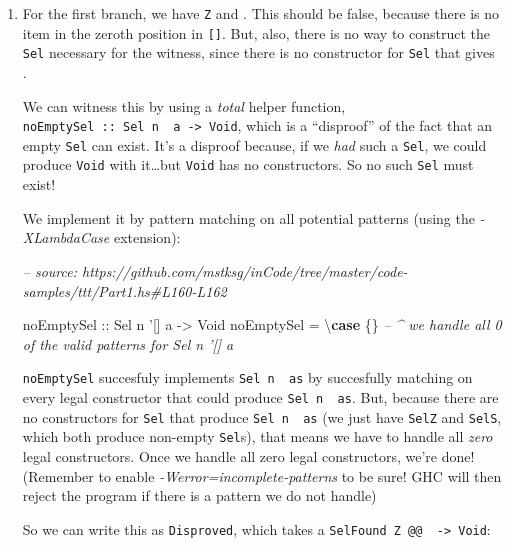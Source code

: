 \documentclass[]{article}
\newenvironment{Shaded}{}{}
\newcommand{\CommentTok}[1]{\textcolor[rgb]{0.38,0.63,0.69}{\textit{#1}}}
\newcommand{\DataTypeTok}[1]{\textcolor[rgb]{0.56,0.13,0.00}{#1}}
\newcommand{\FunctionTok}[1]{\textcolor[rgb]{0.02,0.16,0.49}{#1}}
\newcommand{\KeywordTok}[1]{\textcolor[rgb]{0.00,0.44,0.13}{\textbf{#1}}}
\newcommand{\NormalTok}[1]{#1}
\newcommand{\OtherTok}[1]{\textcolor[rgb]{0.00,0.44,0.13}{#1}}
\begin{document}
\begin{enumerate}
\def\labelenumi{\arabic{enumi}.}
\item
  For the first branch, we have \texttt{\textquotesingle{}Z} and
  \texttt{\textquotesingle{}{[}{]}}. This should be false, because there is no
  item in the zeroth position in \texttt{{[}{]}}. But, also, there is no way to
  construct the \texttt{Sel} necessary for the witness, since there is no
  constructor for \texttt{Sel} that gives \texttt{\textquotesingle{}{[}{]}}.

  We can witness this by using a \emph{total} helper function,
  \texttt{noEmptySel\ ::\ Sel\ n\ \textquotesingle{}{[}{]}\ a\ -\textgreater{}\ Void},
  which is a ``disproof'' of the fact that an empty \texttt{Sel} can exist. It's
  a disproof because, if we \emph{had} such a \texttt{Sel}, we could produce
  \texttt{Void} with it\ldots{}but \texttt{Void} has no constructors. So no such
  \texttt{Sel} must exist!

  We implement it by pattern matching on all potential patterns (using the
  \emph{-XLambdaCase} extension):

\begin{Shaded}
\begin{Highlighting}[]
\CommentTok{-- source: https://github.com/mstksg/inCode/tree/master/code-samples/ttt/Part1.hs#L160-L162}

\OtherTok{noEmptySel ::} \DataTypeTok{Sel}\NormalTok{ n '[] a }\OtherTok{->} \DataTypeTok{Void}
\NormalTok{noEmptySel }\FunctionTok{=}\NormalTok{ \textbackslash{}}\KeywordTok{case}\NormalTok{ \{\}}
            \CommentTok{-- ^ we handle all 0 of the valid patterns for Sel n '[] a}
\end{Highlighting}
\end{Shaded}

  \texttt{noEmptySel} succesfuly implements
  \texttt{Sel\ n\ \textquotesingle{}{[}{]}\ as} by succesfully matching on every
  legal constructor that could produce
  \texttt{Sel\ n\ \textquotesingle{}{[}{]}\ as}. But, because there are no
  constructors for \texttt{Sel} that produce
  \texttt{Sel\ n\ \textquotesingle{}{[}{]}\ as} (we just have \texttt{SelZ} and
  \texttt{SelS}, which both produce non-empty \texttt{Sel}s), that means we have
  to handle all \emph{zero} legal constructors. Once we handle all zero legal
  constructors, we're done! (Remember to enable
  \emph{-Werror=incomplete-patterns} to be sure! GHC will then reject the
  program if there is a pattern we do not handle)

  So we can write this as \texttt{Disproved}, which takes a
  \texttt{SelFound\ \textquotesingle{}Z\ @@\ \textquotesingle{}{[}{]}\ -\textgreater{}\ Void}:


\end{enumerate}
\end{document}
